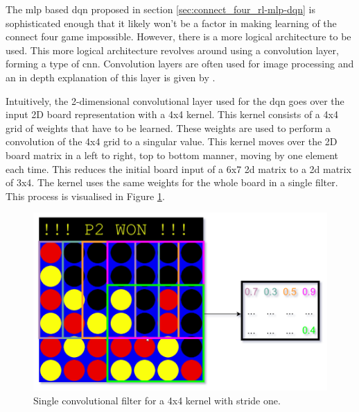 The \gls{mlp} based \gls{dqn} proposed in section \ref{sec:connect_four_rl-mlp-dqn} is sophisticated enough that it likely won't be a factor in making learning of the connect four game impossible.
However, there is a more logical architecture to be used.
This more logical architecture revolves around using a convolution layer, forming a type of \gls{cnn}.
Convolution layers are often used for image processing and an in depth explanation of this layer is given by \citet{cnn_explained}.

Intuitively, the 2-dimensional convolutional layer used for the \gls{dqn} goes over the input 2D board representation with a 4x4 kernel.
This kernel consists of a 4x4 grid of weights that have to be learned.
These weights are used to perform a convolution of the 4x4 grid to a singular value.
This kernel moves over the 2D board matrix in a left to right, top to bottom manner, moving by one element each time.
This reduces the initial board input of a 6x7 2d matrix to a 2d matrix of 3x4.
The kernel uses the same weights for the whole board in a single filter.
This process is visualised in Figure \ref{fig:cnn_kernel_explained}.

\begin{figure}[ht]
    \centering
    \includegraphics[width=0.7\linewidth]{images/cnn_explained.png}
    \captionsetup{width=0.9\linewidth}
    \captionsetup{justification=centering}
    \caption{Single convolutional filter for a 4x4 kernel with stride one.}
    \label{fig:cnn_kernel_explained}
\end{figure}

